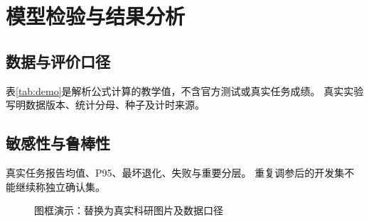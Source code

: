 \section{模型检验与结果分析}
\subsection{数据与评价口径}
表\ref{tab:demo}是解析公式计算的教学值，不含官方测试或真实任务成绩。
真实实验写明数据版本、统计分母、种子及计时来源。

\subsection{敏感性与鲁棒性}
真实任务报告均值、P95、最坏退化、失败与重要分层。
重复调参后的开发集不能继续称独立确认集。
\begin{figure}[htbp]\centering\placeholderfigure
\caption{图框演示：替换为真实科研图片及数据口径}
\end{figure}
